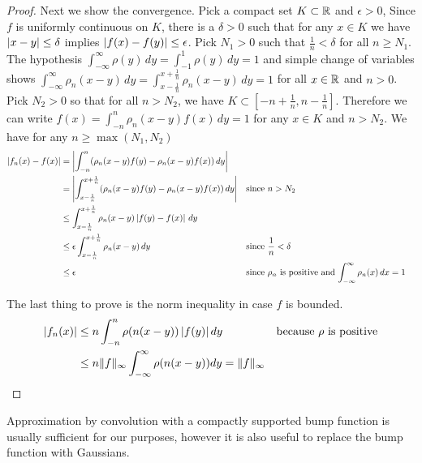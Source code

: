 \documentclass{amsart}
\theoremstyle{remark}
\theoremstyle{definition}
\begin{document}
\begin{proof}
Next we show the convergence.  Pick a compact set $K \subset \mathbb{R}$
and  $\epsilon > 0$,
Since $f$ is uniformly continuous on $K$,  there is a $\delta >0$ such
that for any $x \in K$ we have $\left \vert x - y \right \vert \leq \delta$ implies
$\left \vert f(x) - f(y) \right \vert \leq \epsilon$.  Pick $N_1 > 0$ such that
$\frac{1}{n} < \delta$ for all $n \geq N_1$.  The hypothesis $\int_{-\infty}^\infty
\rho(y) \, dy = \int_{-1}^1
\rho(y) \, dy = 1$ and simple change of variables shows $\int_{-\infty}^\infty
\rho_n(x - y) \, dy = \int_{x - \frac{1}{n}}^{x + \frac{1}{n}}
\rho_n(x - y) \, dy = 1$ for all $x \in \mathbb{R}$ and $n > 0$.  Pick $N_2>0$ so that for all $n > N_2$,
we have $K \subset [-n + \frac{1}{n}, n - \frac{1}{n}]$.  Therefore we can write $f(x) = \int_{- n}^{n}
\rho_n(x - y) f(x)  \, dy = 1$ for any $x \in K$ and $n > N_2$.  We
have for any $n \geq \max(N_1, N_2)$
\begin{align*}
\left \vert f_n(x) - f(x) \right \vert &= \left \vert \int_{- n}^{n} (\rho_n(x -
  y)f(y) -
\rho_n(x- y) f(x)) \, dy \right \vert \\
&= \left \vert \int_{x - \frac{1}{n}}^{x + \frac{1}{n}} (\rho_n(x -
  y)f(y) -
\rho_n(x- y) f(x)) \, dy \right \vert  & & \text{since $n>N_2$}\\
&\leq \int_{x - \frac{1}{n}}^{x + \frac{1}{n}} \rho_n(x- y) \left \vert f(y)
  - f(x) \right \vert \, dy\\
&\leq \epsilon \int_{x -\frac{1}{n}}^{x + \frac{1}{n}} \rho_n(x -  y)
\, dy & &\text{since $\frac{1}{n} < \delta$}\\
&\leq \epsilon & & \text{since $\rho_n$ is positive and
  $\int_{-\infty}^\infty \rho_n(x) \, dx = 1$}
\end{align*}

The last thing to prove is the norm inequality in case $f$ is
bounded.  
\begin{align*}
\left \vert f_n(x) \right \vert &\leq n \int_{-n}^n \rho(n(x - y)) \left \vert  f(y) \right \vert dy & &
\text{because $\rho$ is positive} \\
&\leq n \lVert f \rVert_\infty \int_{-\infty}^\infty \rho(n(x - y)) dy = \lVert f \rVert_\infty 
\end{align*}
\end{proof}

Approximation by convolution with a compactly supported bump function
is usually sufficient for our purposes, however it is also useful to
replace the bump function with Gaussians.  
\end{document}
